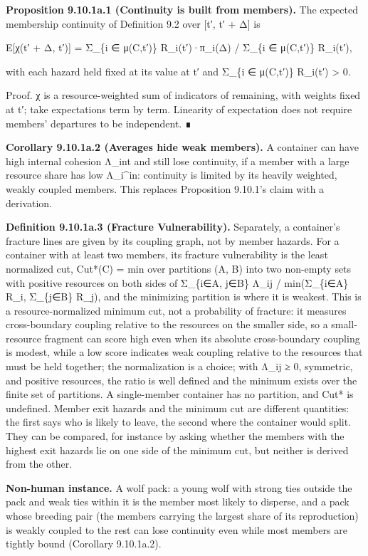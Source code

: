 \documentclass[
]{article}
\begin{document}
\textbf{Proposition 9.10.1a.1 (Continuity is built from members).} The
expected membership continuity of Definition 9.2 over {[}t′, t′ + Δ{]}
is

E{[}χ(t′ + Δ, t′){]} = Σ\_\{i ∈ μ(C,t′)\} R\_i(t′)·π\_i(Δ) / Σ\_\{i ∈
μ(C,t′)\} R\_i(t′),

with each hazard held fixed at its value at t′ and Σ\_\{i ∈ μ(C,t′)\}
R\_i(t′) \textgreater{} 0.

Proof. χ is a resource-weighted sum of indicators of remaining, with
weights fixed at t′; take expectations term by term. Linearity of
expectation does not require members' departures to be independent. ∎

\textbf{Corollary 9.10.1a.2 (Averages hide weak members).} A container
can have high internal cohesion Λ\_int and still lose continuity, if a
member with a large resource share has low Λ\_i\^{}in: continuity is
limited by its heavily weighted, weakly coupled members. This replaces
Proposition 9.10.1's claim with a derivation.

\textbf{Definition 9.10.1a.3 (Fracture Vulnerability).} Separately, a
container's fracture lines are given by its coupling graph, not by
member hazards. For a container with at least two members, its fracture
vulnerability is the least normalized cut, Cut*(C) = min over partitions
(A, B) into two non-empty sets with positive resources on both sides of
Σ\_\{i∈A, j∈B\} Λ\_ij / min(Σ\_\{i∈A\} R\_i, Σ\_\{j∈B\} R\_j), and the
minimizing partition is where it is weakest. This is a
resource-normalized minimum cut, not a probability of fracture: it
measures cross-boundary coupling relative to the resources on the
smaller side, so a small-resource fragment can score high even when its
absolute cross-boundary coupling is modest, while a low score indicates
weak coupling relative to the resources that must be held together; the
normalization is a choice; with Λ\_ij ≥ 0, symmetric, and positive
resources, the ratio is well defined and the minimum exists over the
finite set of partitions. A single-member container has no partition,
and Cut* is undefined. Member exit hazards and the minimum cut are
different quantities: the first says who is likely to leave, the second
where the container would split. They can be compared, for instance by
asking whether the members with the highest exit hazards lie on one side
of the minimum cut, but neither is derived from the other.

\textbf{Non-human instance.} A wolf pack: a young wolf with strong ties
outside the pack and weak ties within it is the member most likely to
disperse, and a pack whose breeding pair (the members carrying the
largest share of its reproduction) is weakly coupled to the rest can
lose continuity even while most members are tightly bound (Corollary
9.10.1a.2).
\end{document}
